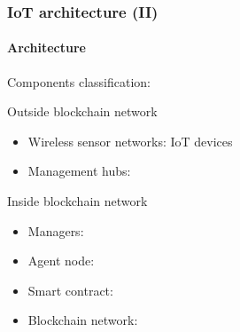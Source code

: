 \documentclass[
    aspectratio=169,                   %
]{beamer}
\begin{document}
    \begin{frame}
        \frametitle{IoT architecture (II)}

        \paragraph{Architecture} Components classification:

        \begin{block}{Outside blockchain network}
            \begin{itemize}
                \item \alert{Wireless sensor networks}: IoT devices 
                \item \alert{Management hubs}:
            \end{itemize}
        \end{block}

        \begin{block}{Inside blockchain network}
            \begin{itemize}
            \item \alert{Managers}: 
            \item \alert{Agent node}:
            \item \alert{Smart contract}: 
            \item \alert{Blockchain network}: 
            \end{itemize}
        \end{block}
    \end{frame}



\end{document}
